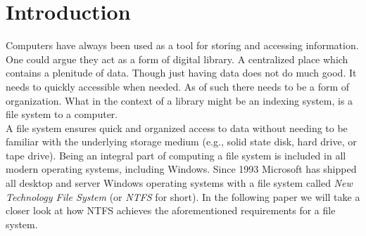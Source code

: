 \section{Introduction}
Computers have always been used as a tool for storing and accessing information. One could argue they act as a form of digital library. A centralized place which contains a plenitude of data.
Though just having data does not do much good. It needs to quickly accessible when needed. As of such there  needs to be a form of organization. What in the context of a library might be an indexing system, is a file system to a computer.\\
A file system ensures quick and organized access to data without needing to be familiar with the underlying storage medium (e.g., solid state disk, hard drive, or tape drive).
Being an integral part of computing a file system is included in all modern operating systems, including Windows. Since 1993\cite{Custer:1994:IWN} Microsoft has shipped all desktop and server Windows operating systems with a file system called \textit{New Technology File System} (or \textit{NTFS} for short). In the following paper we will take a closer look at how NTFS achieves the aforementioned requirements for a file system.